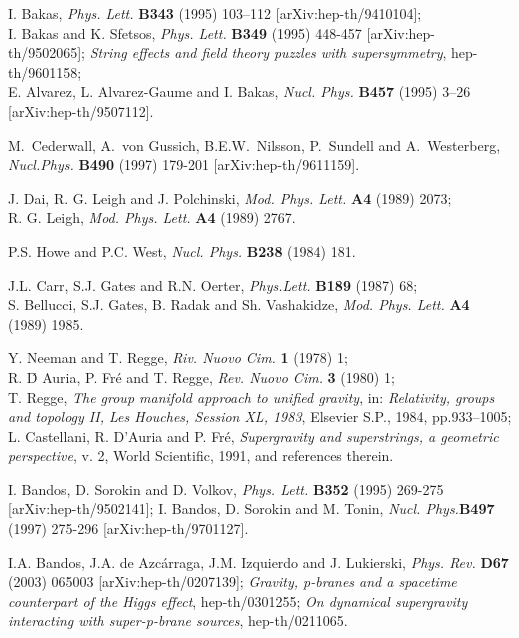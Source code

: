 \documentclass[a4paper,11pt]{article}
\begin{document}
\begin{thebibliography}{99}
 I. Bakas, 
{\em Phys. Lett.} {\bf B343} (1995) 103--112
 [arXiv:hep-th/9410104];
 \\ I. Bakas and K. Sfetsos, 
 {\em Phys. Lett.} {\bf B349} (1995) 448-457 [arXiv:hep-th/9502065];
 {\sl String effects and field theory puzzles with supersymmetry},
 hep-th/9601158;
\\ E. Alvarez, L. Alvarez-Gaume and I. Bakas,
 {\em Nucl. Phys.} {\bf B457} (1995) 3--26 [arXiv:hep-th/9507112].
     


M.\ Cederwall, A.\ von Gussich, B.E.W.\ Nilsson, 
P.\ Sundell and  A.\ Westerberg, 
{\em Nucl.Phys.} {\bf B490} (1997) 179-201 [arXiv:hep-th/9611159]. 

J. Dai, R. G. Leigh and J. Polchinski, 
{\em Mod. Phys. Lett.} {\bf A4} (1989) 2073;
\\ R. G.
Leigh, {\em Mod. Phys. Lett.} {\bf A4} (1989) 2767.


P.S. Howe and P.C. West, 
{\em Nucl. Phys.} {\bf B238} (1984) 181.


J.L. Carr, S.J. Gates and R.N. Oerter, 
{\em Phys.Lett.} {\bf B189} (1987) 68; 
\\ S. Bellucci, S.J. Gates, B. Radak and Sh. Vashakidze,
{\em Mod. Phys. Lett.} {\bf A4} (1989) 1985.  


Y. Neeman and T. Regge, 
{\em Riv. Nuovo Cim.} {\bf 1} (1978) 1; 
\\ R. \'D Auria, P. Fr\'e and T. Regge, {\em Rev. Nuovo Cim.} {\bf 3} 
(1980) 1; \\  
T. Regge, {\sl The group manifold approach to unified gravity}, 
in: {\it Relativity, groups and topology II, Les Houches, Session XL, 
1983}, Elsevier S.P., 1984, pp.933--1005; \\ 
L. Castellani, R. D'Auria and  P. Fr\'e, {\sl Supergravity and
superstrings, a geometric perspective}, v. 2, World Scientific, 
1991, and references therein. 

 I. Bandos, D. Sorokin and D. Volkov,
             {\em Phys. Lett.} {\bf B352} (1995)  269-275  
[arXiv:hep-th/9502141]; 
I. Bandos, D. Sorokin and M. Tonin, 
{\em Nucl. Phys.}{\bf B497} (1997) 275-296
[arXiv:hep-th/9701127].


I.A. Bandos, J.A. de Azc\'arraga, J.M. Izquierdo and 
J. Lukierski, 
{\em Phys. Rev.} {\bf D67} (2003) 065003 [arXiv:hep-th/0207139]; 
{\sl Gravity, p-branes and a spacetime counterpart of the Higgs effect}, 
hep-th/0301255; 
{\sl On dynamical supergravity interacting with super-p-brane sources}, 
 hep-th/0211065.  


\end{thebibliography}
\end{document}
